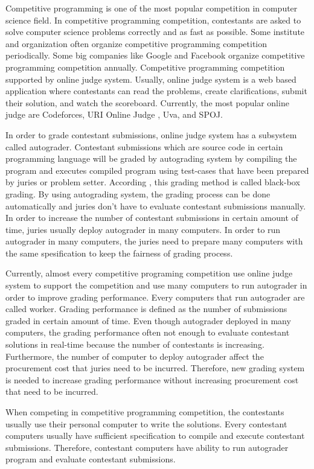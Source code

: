\documentclass[conference]{IEEEtran}
\begin{document}
Competitive programming is one of the most popular competition in computer science field. In competitive programming competition, contestants are asked to solve computer science problems correctly and as fast as possible. Some institute and organization often organize competitive programming competition periodically. Some big companies like Google and Facebook organize competitive programming competition annually. Competitive programming competition supported by online judge system. Usually, online judge system is a web based application where contestants can read the problems, create clarifications, submit their solution, and watch the scoreboard. Currently, the most popular online judge are Codeforces, URI Online Judge \cite{uriojpaper}, Uva, and SPOJ.

In order to grade contestant submissions, online judge system has a subsystem called autograder. Contestant submissions which are source code in certain programming language will be graded by autograding system by compiling the program and executes compiled program using test-cases that have been prepared by juries or problem setter. According \cite{jordanioi}, this grading method is called black-box grading. By using autograding system, the grading process can be done automatically and juries don't have to evaluate contestant submissions manually. In order to increase the number of contestant submissions in certain amount of time, juries usually deploy autograder in many computers. In order to run autograder in many computers, the juries need to prepare many computers with the same spesification to keep the fairness of grading process.

Currently, almost every competitive programing competition use online judge system to support the competition and use many computers to run autograder in order to improve grading performance. Every computers that run autograder are called worker. Grading performance is defined as the number of submissions graded in certain amount of time. Even though autograder deployed in many computers, the grading performance often not enough to evaluate contestant solutions in real-time because the number of contestants is increasing. Furthermore, the number of computer to deploy autograder affect the procurement cost that juries need to be incurred. Therefore, new grading system is needed to increase grading performance without increasing procurement cost that need to be incurred.

When competing in competitive programming competition, the contestants usually use their personal computer to write the solutions. Every contestant computers usually have sufficient specification to compile and execute contestant submissions. Therefore, contestant computers have ability to run autograder program and evaluate contestant submissions.
\end{document}
